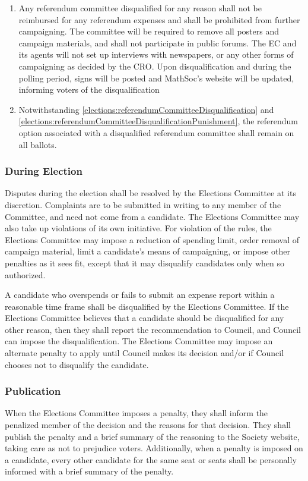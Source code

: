 \begin{enumerate}
				\begin{enumerate}
					\item \label{elections:referendumCommitteeDisqualificationPunishment} Any referendum committee disqualified for any reason shall not be reimbursed for any referendum expenses and shall be prohibited from further campaigning. The committee will be required to remove all posters and campaign materials, and shall not participate in public forums. The EC and its agents will not set up interviews with newspapers, or any other forms of campaigning as decided by the CRO. Upon disqualification and during the polling period, signs will be posted and MathSoc's website will be updated, informing voters of the disqualification
					\item Notwithstanding \cref{elections:referendumCommitteeDisqualification} and \cref{elections:referendumCommitteeDisqualificationPunishment}, the referendum option associated with a disqualified referendum committee shall remain on all ballots.
				\end{enumerate}
		\end{enumerate}

    \subsubsection{During Election}
Disputes during the election shall be resolved by the Elections Committee at its discretion.
Complaints are to be submitted in writing to any member of the Committee, and need not come from a candidate.
The Elections Committee may also take up violations of its own initiative.
For violation of the rules, the Elections Committee may impose a reduction of spending limit, order removal of campaign material, limit a candidate's means of campaigning, or impose other penalties as it sees fit, except that it may disqualify candidates only when so authorized.

A candidate who overspends or fails to submit an expense report within a reasonable time frame shall be disqualified by the Elections Committee.
If the Elections Committee believes that a candidate should be disqualified for any other reason, then they shall report the recommendation to Council, and Council can impose the disqualification.
The Elections Committee may impose an alternate penalty to apply until Council makes its decision and/or if Council chooses not to disqualify the candidate.

\subsubsection{Publication}
When the Elections Committee imposes a penalty, they shall inform the penalized member of the decision and the reasons for that decision.
They shall publish the penalty and a brief summary of the reasoning to the Society website, taking care as not to prejudice voters.
Additionally, when a penalty is imposed on a candidate, every other candidate for the same seat or seats shall be personally informed with a brief summary of the penalty.

